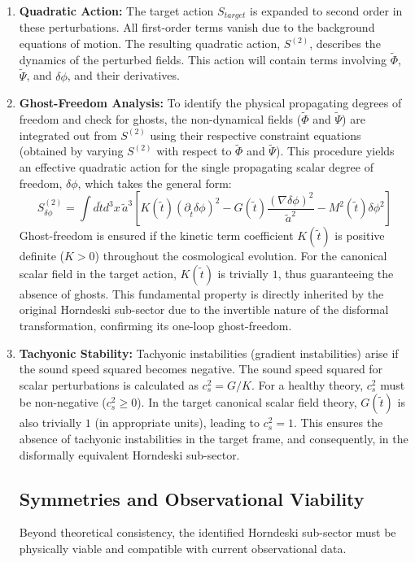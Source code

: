 \documentclass[twocolumn]{aastex631}
\begin{document}
\begin{enumerate}
\begin{enumerate}
    \item \textbf{Quadratic Action:} The target action $S_{target}$ is expanded to second order in these perturbations. All first-order terms vanish due to the background equations of motion. The resulting quadratic action, $S^{(2)}$, describes the dynamics of the perturbed fields. This action will contain terms involving $\tilde{\Phi}$, $\tilde{\Psi}$, and $\delta\phi$, and their derivatives.

    \item \textbf{Ghost-Freedom Analysis:} To identify the physical propagating degrees of freedom and check for ghosts, the non-dynamical fields ($\tilde{\Phi}$ and $\tilde{\Psi}$) are integrated out from $S^{(2)}$ using their respective constraint equations (obtained by varying $S^{(2)}$ with respect to $\tilde{\Phi}$ and $\tilde{\Psi}$). This procedure yields an effective quadratic action for the single propagating scalar degree of freedom, $\delta\phi$, which takes the general form:
    \begin{equation}
    S^{(2)}_{\delta\phi} = \int d\tilde{t} d^3x \, \tilde{a}^3 \left[ K(\tilde{t}) (\partial_{\tilde{t}}\delta\phi)^2 - G(\tilde{t}) \frac{(\nabla\delta\phi)^2}{\tilde{a}^2} - M^2(\tilde{t}) \delta\phi^2 \right]
    \end{equation}
    Ghost-freedom is ensured if the kinetic term coefficient $K(\tilde{t})$ is positive definite ($K>0$) throughout the cosmological evolution. For the canonical scalar field in the target action, $K(\tilde{t})$ is trivially $1$, thus guaranteeing the absence of ghosts. This fundamental property is directly inherited by the original Horndeski sub-sector due to the invertible nature of the disformal transformation, confirming its one-loop ghost-freedom.

    \item \textbf{Tachyonic Stability:} Tachyonic instabilities (gradient instabilities) arise if the sound speed squared becomes negative. The sound speed squared for scalar perturbations is calculated as $c_s^2 = G/K$. For a healthy theory, $c_s^2$ must be non-negative ($c_s^2 \ge 0$). In the target canonical scalar field theory, $G(\tilde{t})$ is also trivially $1$ (in appropriate units), leading to $c_s^2 = 1$. This ensures the absence of tachyonic instabilities in the target frame, and consequently, in the disformally equivalent Horndeski sub-sector.

\subsection{Symmetries and Observational Viability}
Beyond theoretical consistency, the identified Horndeski sub-sector must be physically viable and compatible with current observational data.


\end{enumerate}
\end{enumerate}
\end{document}
